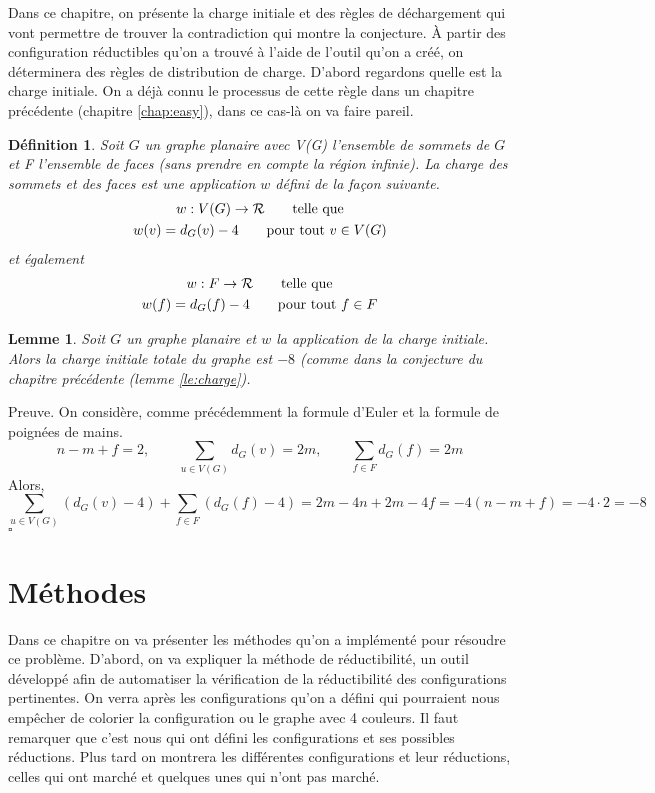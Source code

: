 \documentclass[10pt,a4paper]{article}
\newtheorem{definition}{Définition}
\newtheorem{lemme}{Lemme}
\newcommand{\ep}{{\hfill $\square$}}
\begin{document}
Dans ce chapitre, on présente la charge initiale et des règles de déchargement qui vont permettre de trouver la contradiction qui montre la conjecture. \` A partir des configuration réductibles qu'on a trouvé à l'aide de l'outil qu'on a créé, on déterminera des règles de distribution de charge. D'abord regardons quelle est la charge initiale. On a déjà connu le processus de cette règle dans un chapitre précédente (chapitre \ref{chap:easy}), dans ce cas-là on va faire pareil.

\begin{definition}
Soit $G$ un graphe planaire avec V(G) l'ensemble de sommets de $G$ et F l'ensemble de faces (sans prendre en compte la région infinie). La \emph{charge} des sommets et des faces est une application $w$ défini de la façon suivante.
$$
\gathered
w: V(G) \to \mathcal{R} \qquad \textrm{telle que}\\
w(v) = d_G(v) - 4 \qquad \textrm{pour tout $v \in V(G)$}\\
\endgathered
$$
et également
$$
\gathered
w: F \to \mathcal{R} \qquad \textrm{telle que}\\
w(f) = d_G(f) - 4 \qquad \textrm{pour tout $f \in F$}\\
\endgathered
$$
\end{definition}

\begin{lemme}
Soit $G$ un graphe planaire et $w$ la application de la charge initiale. Alors la charge initiale totale du graphe est $-8$ (comme dans la conjecture du chapitre précédente (lemme \ref{le:charge}).
\end{lemme}

Preuve.
On considère, comme précédemment la formule d'Euler et la formule de poignées de mains.
$$
n - m + f = 2, \qquad \sum_{u \in V(G)} d_G(v) = 2m, \qquad \sum_{f \in F} d_G(f) = 2m
$$
Alors,
$$
\sum_{u \in V(G)} (d_G(v) - 4) + \sum_{f \in F} (d_G(f) - 4) = 2m - 4n + 2m - 4f = -4( n - m + f) = -4 \cdot 2 = -8
$$
\ep



\section{Méthodes}

Dans ce chapitre on va présenter les méthodes qu'on a implémenté pour résoudre ce problème. D'abord, on va expliquer la méthode de réductibilité, un outil développé afin de automatiser la vérification de la réductibilité des configurations pertinentes. On verra après les configurations qu'on a défini qui pourraient nous empêcher de colorier la configuration ou le graphe avec 4 couleurs. Il faut remarquer que c'est nous qui ont défini les configurations et ses possibles réductions. Plus tard on montrera les différentes configurations et leur réductions, celles qui ont marché et quelques unes qui n'ont pas marché. 
\end{document}
